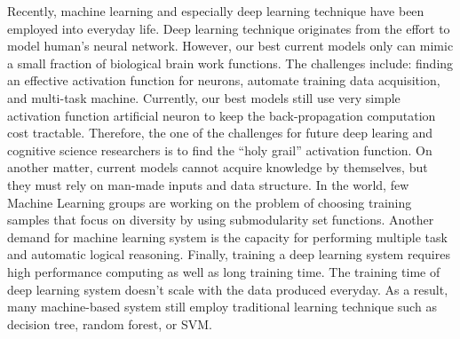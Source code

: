 \documentclass[12pt,twoside]{article}
\begin{document}
\begin{exercises}
\ifsolution \solution{}
Recently, machine learning and especially deep learning technique have been
employed into everyday life. Deep learning technique originates from the
effort to model human's neural network. However, our best current models only
can mimic a small fraction of biological brain work functions. The challenges
include: finding an effective activation function for neurons, automate training
data acquisition, and multi-task machine. Currently, our best models still use
very simple activation function artificial neuron to keep the back-propagation
computation cost tractable. Therefore, the one of the challenges for future deep 
learing and cognitive science researchers is to find the ``holy grail'' activation
function. On another matter, current models cannot acquire knowledge by themselves,
but they must rely on man-made inputs and data structure. In the world, few Machine 
Learning groups are working on the problem of choosing training samples that focus 
on diversity by using submodularity set functions. Another demand for machine 
learning system is the capacity for performing multiple task and automatic logical 
reasoning.  Finally, training a deep learning system requires high performance 
computing as well as long training time. The training time of deep learning system
doesn't scale with the data produced everyday. As a result, many machine-based system
still employ traditional learning technique such as decision tree, random forest, or
SVM. 
\fi


\end{exercises}
\end{document}
